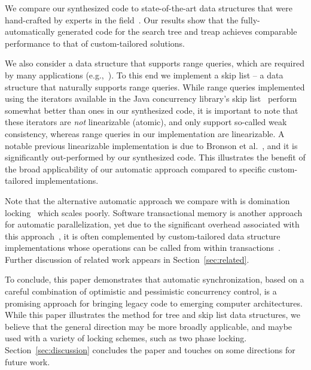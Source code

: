 We compare our synthesized code to state-of-the-art data structures
that were hand-crafted by experts in the field~\cite{DrachslerVY2014,BronsonCCO2010,ConcurrentSkipList,fraser2004practical}.
Our results show that the
fully-automatically generated code for the search tree and treap
achieves comparable performance to that of
custom-tailored solutions.

We also consider a data structure that supports range queries, which are required by
many applications (e.g.,~\cite{levelDB,FerroJKRY14}). To this end we implement a skip list -- a data structure that naturally supports range queries.
While range queries implemented using the iterators available in the Java concurrency library's skip list~\cite{ConcurrentSkipList} perform
somewhat better than ones in our synthesized code, it is important to note that these iterators are \emph{not}
linearizable (atomic), and only support so-called weak consistency, whereas range queries in our implementation are linearizable.
A notable previous linearizable implementation is due to Bronson et al.~\cite{BronsonCCO2010},
and it is significantly out-performed by our synthesized code.
%
This illustrates the benefit of the broad applicability
of our automatic approach compared to specific custom-tailored implementations.

Note that the alternative automatic approach we compare with is domination locking~\cite{Gueta2011} which scales poorly.
Software transactional memory is another approach for automatic parallelization,
yet due to the significant overhead associated with this approach~\cite{Cascaval:2008,DuffyTM2010}, it is often complemented
by custom-tailored data structure implementations whose operations
can be called from within transactions~\cite{Herlihy:2008,Koskinen:2010,NathanBronson11}.
%
Further discussion of related work appears in Section~\ref{sec:related}.

To conclude, this paper demonstrates that automatic synchronization, based on a careful combination of optimistic and
pessimistic concurrency control, is a promising approach for bringing legacy code to emerging computer architectures.
While this paper illustrates the method for tree and skip list data structures, we believe that the general direction may be more broadly applicable, and maybe used with a variety of locking schemes, such as two phase locking.
Section~\ref{sec:discussion} concludes the paper and touches on some directions for future work. 